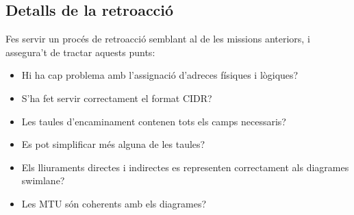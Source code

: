 \subsection*{Detalls de la retroacció}

Fes servir un procés de retroacció semblant al de les missions anteriors, i assegura't de tractar aquests punts:
\begin{itemize}
\item Hi ha cap problema amb l'assignació d'adreces físiques i lògiques?\\[-0.5cm]
\item S'ha fet servir correctament el format CIDR?\\[-0.5cm]
\item Les taules d'encaminament contenen tots els camps necessaris?\\[-0.5cm]
\item Es pot simplificar més alguna de les taules?\\[-0.5cm]
\item Els lliuraments directes i indirectes es representen correctament als diagrames swimlane?\\[-0.5cm]
\item Les MTU són coherents amb els diagrames?
\end{itemize}
